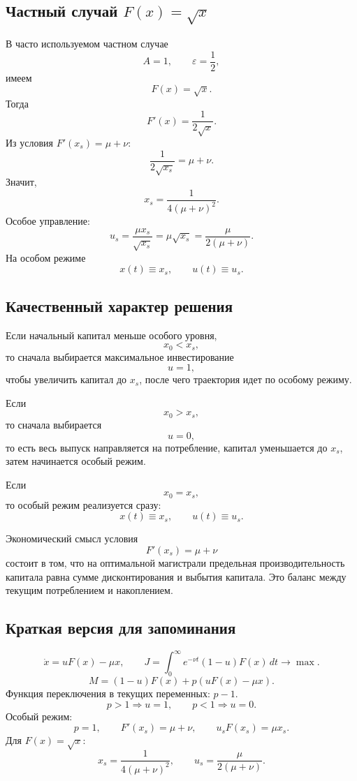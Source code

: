\documentclass[12pt,a4paper]{article}
\newcommand{\eps}{\varepsilon}
\begin{document}
\subsection{Частный случай \texorpdfstring{\(F(x)=\sqrt{x}\)}{F(x)=sqrt(x)}}

В часто используемом частном случае
\[
    A=1,
    \qquad
    \eps=\frac12,
\]
имеем
\[
    F(x)=\sqrt{x}.
\]
Тогда
\[
    F'(x)=\frac{1}{2\sqrt{x}}.
\]
Из условия \(F'(x_s)=\mu+\nu\):
\[
    \frac{1}{2\sqrt{x_s}}=\mu+\nu.
\]
Значит,
\[
    x_s=\frac{1}{4(\mu+\nu)^2}.
\]
Особое управление:
\[
    u_s=\frac{\mu x_s}{\sqrt{x_s}}=\mu\sqrt{x_s}=\frac{\mu}{2(\mu+\nu)}.
\]
На особом режиме
\[
    x(t)\equiv x_s,
    \qquad
    u(t)\equiv u_s.
\]

\subsection{Качественный характер решения}

Если начальный капитал меньше особого уровня,
\[
    x_0<x_s,
\]
то сначала выбирается максимальное инвестирование
\[
    u=1,
\]
чтобы увеличить капитал до \(x_s\), после чего траектория идет по особому режиму.

Если
\[
    x_0>x_s,
\]
то сначала выбирается
\[
    u=0,
\]
то есть весь выпуск направляется на потребление, капитал уменьшается до \(x_s\), затем начинается особый режим.

Если
\[
    x_0=x_s,
\]
то особый режим реализуется сразу:
\[
    x(t)\equiv x_s,
    \qquad
    u(t)\equiv u_s.
\]

Экономический смысл условия
\[
    F'(x_s)=\mu+\nu
\]
состоит в том, что на оптимальной магистрали предельная производительность капитала равна сумме дисконтирования и выбытия капитала. Это баланс между текущим потреблением и накоплением.

\subsection{Краткая версия для запоминания}

\[
    \dot x=uF(x)-\mu x,
    \qquad
    J=\int_0^\infty e^{-\nu t}(1-u)F(x)\,dt\to\max.
\]
\[
    M=(1-u)F(x)+p(uF(x)-\mu x).
\]
Функция переключения в текущих переменных: \(p-1\).
\[
    p>1\Rightarrow u=1,
    \qquad
    p<1\Rightarrow u=0.
\]
Особый режим:
\[
    p=1,
    \qquad
    F'(x_s)=\mu+\nu,
    \qquad
    u_sF(x_s)=\mu x_s.
\]
Для \(F(x)=\sqrt{x}\):
\[
    x_s=\frac{1}{4(\mu+\nu)^2},
    \qquad
    u_s=\frac{\mu}{2(\mu+\nu)}.
\]
\end{document}
